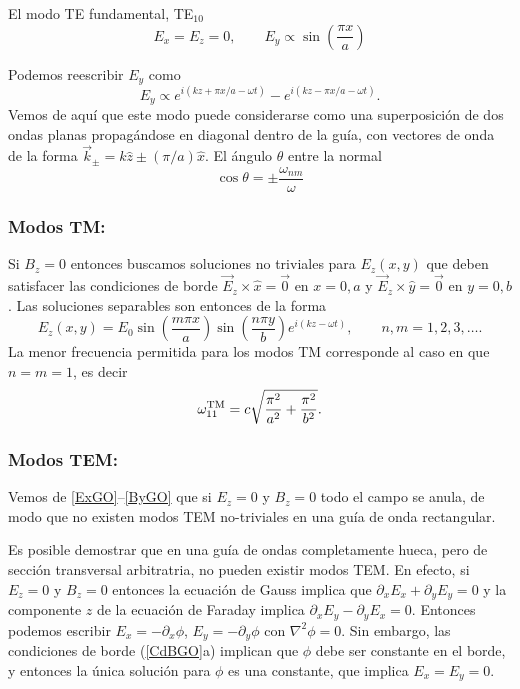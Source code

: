 El modo TE fundamental, TE$_{10}$
\begin{equation}
E_x=E_z=0, \qquad E_y \propto \sin\left(\frac{\pi x}{a}\right) 
\end{equation}

Podemos reescribir $E_y$ como
\begin{equation}
E_y\propto e^{i(kz+\pi x/a-\omega t)}-e^{i(kz-\pi x/a-\omega t)}.
\end{equation}
Vemos de aquí que este modo puede considerarse como una superposición de dos ondas planas propagándose en diagonal dentro de la guía, con vectores de onda de la forma $\vec{k}_\pm = k\hat{z}\pm(\pi /a)\hat{x}$. El ángulo $\theta$ entre la normal 
\begin{equation}
\cos\theta=\pm\frac{\omega_{nm}}{\omega}
\end{equation}


\subsubsection{Modos TM:}  Si $B_z=0$ entonces buscamos soluciones no triviales para $E_z(x,y)$ que deben satisfacer las condiciones de borde $\vec{E}_z\times\hat{x}=\vec{0}$ en $x=0,a$ y $\vec{E}_z\times\hat{y}=\vec{0}$ en $y=0,b$. Las soluciones separables son entonces de la forma
\begin{equation}
E_z(x, y) = E_0 \sin\left(\frac{m \pi x}{a}\right) \sin\left(\frac{n \pi y}{b}\right)e^{i(kz-\omega t)}, \qquad n,m=1,2,3,\dots.
\end{equation}
La menor frecuencia permitida para los modos TM corresponde al caso en que $n=m=1$, es decir
\begin{equation}
\omega^{\rm TM}_{11}=c\sqrt{\frac{\pi^2}{a^2}+\frac{\pi^2}{b^2}}.
\end{equation}

\subsubsection{Modos TEM:} 

Vemos de \eqref{ExGO}--\eqref{ByGO} que si $E_z=0$ y $B_z=0$ todo el campo se anula, de modo que no existen modos TEM no-triviales en una guía de onda rectangular.

Es posible demostrar que en una guía de ondas completamente hueca, pero de sección transversal arbitratria, no pueden existir modos TEM. En efecto, si $E_z=0$ y $B_z= 0$ entonces la ecuación de Gauss implica que $\partial_xE_x+\partial_yE_y=0$ y la componente $z$ de la ecuación de Faraday implica $\partial_xE_y-\partial_yE_x=0$. Entonces podemos escribir $E_x=-\partial_x\phi$, $E_y=-\partial_y\phi$ con $\nabla^2\phi=0$. Sin embargo, las condiciones de borde (\ref{CdBGO}a) implican que $\phi$ debe ser constante en el borde, y entonces la única solución para $\phi$ es una constante, que implica $E_x=E_y=0$.


